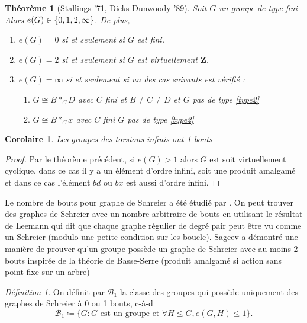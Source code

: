 \documentclass[a4paper]{article}
\newtheorem{cor}[lem]{Corolaire}
\newtheorem{thm}[lem]{Théorème}
\theoremstyle{remark}%
\newtheorem{defn}[lem]{Définition}
\DeclarePairedDelimiter\set{\lbrace}{\rbrace}
\newcommand*{\iso}{\cong}%
\newcommand*{\field}[1]{\mathbf{#1}}
\newcommand*{\Z}{\field{Z}}
\newcommand*{\B}{\mathcal{B}_1}
\begin{document}
\begin{thm}[Stallings '71, Dicks-Dunwoody '89]
Soit $G$ un groupe de type fini Alors $e(G) \in \set*{0,1,2,\infty}$. De plus,
\begin{enumerate}
\item \label{type1} $e(G) = 0$ si et seulement si $G$ est fini.
\item \label{type2} $e(G) = 2$ si et seulement si $G$ est virtuellement $\Z$.
\item\label{type3} $e(G) = \infty$ si et seulement si un des cas suivants est vérifié :
	\begin{enumerate}
	\item $G \iso B *_C D$ avec $C$ fini et $B \neq C \neq D$ et $G$ pas de type \ref{type2}
	\item $G \iso B *_C x$ avec $C$ fini $G$ pas de type \ref{type2}
	\end{enumerate}
\end{enumerate}
\end{thm}
%
%
\begin{cor}
Les groupes des torsions infinis ont 1 bouts
\end{cor}
%
\begin{proof}
Par le théorème précédent, si $e(G)>1$ alors $G$ est soit virtuellement cyclique, dans ce cas il y a un élément d'ordre infini, soit une produit amalgamé et dans ce cas l'élément $bd$ ou $bx$ est aussi d'ordre infini.
\end{proof}
%
%
Le nombre de bouts pour graphe de Schreier a été étudié par \cite{Scott1977,Swarup1977,Muller1981,Kropholler1989}. On peut trouver des graphes de Schreier avec un nombre arbitraire de bouts en utilisant le résultat de Leemann qui dit que chaque graphe régulier de degré pair peut être vu comme un Schreier (modulo une petite condition sur les boucle).
%
%
Sageev a démontré une manière de prouver qu'un groupe possède un graphe de Schreier avec au moins 2 bouts inspirée de la théorie de Basse-Serre (produit amalgamé si action sans point fixe sur un arbre)
%
\begin{defn}
On définit par $\B$ la classe des groupes qui possède uniquement des graphes de Schreier à 0 ou 1 bouts, c-à-d
\begin{equation*}
\B \coloneqq \{G : G \text{ est un groupe et } \forall H \leq G, e(G,H) \leq 1\}.
\end{equation*}
\end{defn}
%
%
\end{document}

